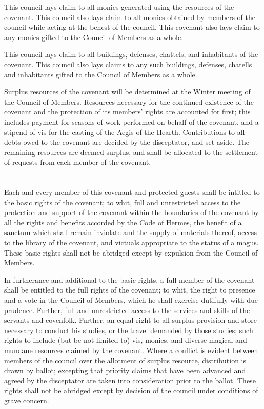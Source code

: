 \documentclass [a4paper,portrait]{article}
\begin{document}
\begin{multicols}{2}
\begin{small}
	This council lays claim to all monies generated using the resources of the covenant. This council also
	lays claim to all monies obtained by members of the council while acting at the behest of the council.
	This covenant also lays claim to any monies gifted to the Council of Members as a whole.
	
	This council lays claim to all buildings, defenses, chattels, and inhabitants of the covenant. This
	council also lays claims to any such buildings, defenses, chatells and inhabitants gifted to the
	Council of Members as a whole.
	
	Surplus resources of the covenant will be determined at the Winter meeting of the Council of Members.
	Resources necessary for the continued existence of the covenant and the protection of its members'
	rights are accounted for first; this includes payment for seasons of work performed on behalf of the
	covenant, and a stipend of vis for the casting of the Aegis of the Hearth. Contributions to all debts
	owed to the covenant are decided by the disceptator, and set aside. The remaining resources are deemed
	surplus, and shall be allocated to the settlement of requests from each member of the covenant.
	
\section*{\fontsize{30}{35}\selectfont{Rights of the Members of this Covenant}}
	Each and every member of this covenant and protected guests shall be intitled to the basic rights of
	the covenant; to whit, full and unrestricted access to the protection and support of the covenant within
	the boundaries of the covenant by all the rights and benefits accorded by the Code of Hermes, the
	benefit of a sanctum which shall remain inviolate and the supply of materials thereof, access to the
	library of the covenant, and victuals appropriate to the status of a magus. These basic rights shall not
	be abridged except by expulsion from the Council of Members.
	
	In furtherance and additional to the basic rights, a full member of the covenant shall be entitled to
	the full rights of the covenant; to whit, the right to presence and a vote in the Council of Members,
	which he shall exercise dutifully with due prudence. Further, full and unrestricted access to the
	services and skills of the servants and covenfolk. Further, an equal right to all surplus provision and
	store necessary to conduct his studies, or the travel demanded by those studies; such rights to include
	(but be not limited to) vis, monies, and diverse magical and mundane resources claimed by the covenant.
	Where a conflict is evident between members of the council over the allotment of surplus resource,
	distribution is drawn by ballot; excepting that priority claims that have been advanced and agreed by
	the disceptator are taken into consideration prior to the ballot. These rights shall not be abridged
	except by decision of the council under conditions of grave concern.
	

\end{small}
\end{multicols}
\end{document}
